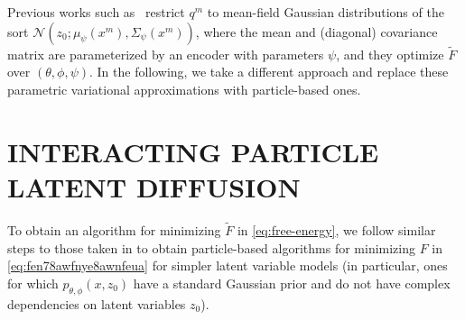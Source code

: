 \documentclass[twoside]{article}
\begin{document}
Previous works such as~\cite{wehenkeldiffusionpriorsvariational2021} restrict $q^m$ to mean-field Gaussian distributions of the sort $\mathcal{N}(z_0;\mu_\psi(x^m),\Sigma_\psi(x^m))$, where the mean and (diagonal) covariance matrix are parameterized by an encoder with parameters $\psi$, and they optimize $\tilde{F}$ over $(\theta,\phi,\psi)$. In the following, we take a different approach and replace these parametric variational approximations with particle-based ones.


\section{INTERACTING PARTICLE LATENT DIFFUSION}\label{sec:gradient_flow_ldm}
To obtain an algorithm for minimizing $\tilde{F}$ in \eqref{eq:free-energy}, we follow similar steps to those taken in \citet{kuntz23a} to obtain particle-based algorithms for minimizing $F$ in \eqref{eq:fen78awfnye8awnfeua} for simpler latent variable models (in particular, ones for which $p_{\theta,\phi}(x,z_0)$ have a standard Gaussian prior and do not have complex dependencies on latent variables $z_0$). 
\end{document}
